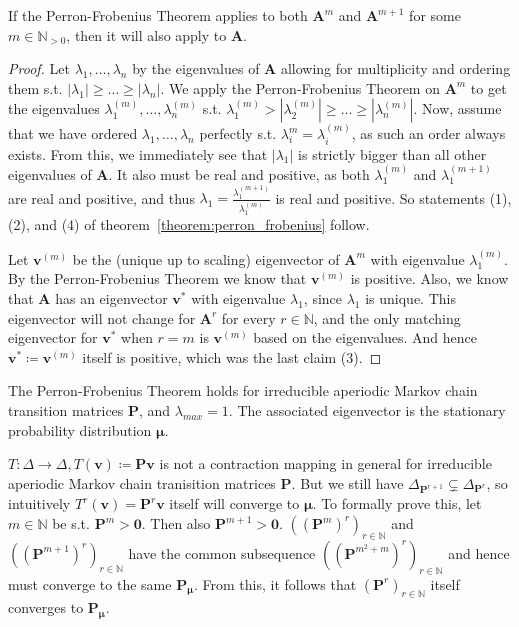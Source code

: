 \documentclass[../../main.tex]{subfiles}
\begin{document}
\begin{lemma}
    \label{lemma:perron_frobenius_extension_A_to_the_m}
    If the Perron-Frobenius Theorem applies to both $\bm{A}^m$ and $\bm{A}^{m+1}$ for some $m \in \mathbb{N}_{>0}$, then it will also apply to $\bm{A}$.
\end{lemma}
\vspace{-2.5em}
\begin{proof}
    Let $\lambda_1, \dots, \lambda_n$ by the eigenvalues of $\bm{A}$ allowing for multiplicity and ordering them s.t. $|\lambda_1| \geq \dots \geq |\lambda_n|$. We apply the Perron-Frobenius Theorem on $\bm{A}^{m}$ to get the eigenvalues $\lambda_1^{(m)}, \dots, \lambda_n^{(m)}$ s.t. $\lambda_1^{(m)} > |\lambda_2^{(m)}| \geq \dots \geq |\lambda_n^{(m)}|$. Now, assume that we have ordered $\lambda_1, \dots, \lambda_n$ perfectly s.t. $\lambda_i^{m} = \lambda_i^{(m)}$, as such an order always exists. From this, we immediately see that $|\lambda_1|$ is strictly bigger than all other eigenvalues of $\bm{A}$. It also must be real and positive, as both $\lambda_1^{(m)}$ and $\lambda_1^{(m + 1)}$ are real and positive, and thus $\lambda_1 = \frac{\lambda_1^{(m + 1)}}{\lambda_1^{(m)}}$ is real and positive. So statements (1), (2), and (4) of theorem~\ref{theorem:perron_frobenius} follow.

    Let $\bm{v}^{(m)}$ be the (unique up to scaling) eigenvector of $\bm{A}^{m}$ with eigenvalue $\lambda_1^{(m)}$. By the Perron-Frobenius Theorem we know that $\bm{v}^{(m)}$ is positive. Also, we know that $\bm{A}$ has an eigenvector $\bm{v}^*$ with eigenvalue $\lambda_1$, since $\lambda_1$ is unique. This eigenvector will not change for $\bm{A}^r$ for every $r \in \mathbb{N}$, and the only matching eigenvector for $\bm{v}^*$ when $r = m$ is $\bm{v}^{(m)}$ based on the eigenvalues. And hence $\bm{v}^* \coloneqq \bm{v}^{(m)}$ itself is positive, which was the last claim (3).
\end{proof}

\begin{corollary}
    The Perron-Frobenius Theorem holds for irreducible aperiodic Markov chain transition matrices $\bm{P}$, and $\lambda_{max} = 1$. The associated eigenvector is the stationary probability distribution $\bm{\mu}$.
\end{corollary}

\begin{remark}
    $T: \Delta \to \Delta, T(\bm{v}) \coloneqq \bm{Pv}$ is not a contraction mapping in general for irreducible aperiodic Markov chain tranisition matrices $\bm{P}$. But we still have $\Delta_{\bm{P}^{r+1}} \subsetneq \Delta_{\bm{P}^{r}}$, so intuitively $T^{r}(\bm{v}) = \bm{P}^r\bm{v}$ itself will converge to $\bm{\mu}$. To formally prove this, let $m \in \mathbb{N}$ be s.t. $\bm{P}^m > \bm{0}$. Then also $\bm{P}^{m + 1} > \bm{0}$. $((\bm{P}^m)^r)_{r \in \mathbb{N}}$ and $((\bm{P}^{m + 1})^r)_{r \in \mathbb{N}}$ have the common subsequence $((\bm{P}^{m^2 + m})^r)_{r \in \mathbb{N}}$ and hence must converge to the same $\bm{P_\mu}$. From this, it follows that $(\bm{P}^r)_{r \in \mathbb{N}}$ itself converges to $\bm{P_\mu}$.
\end{remark}
\end{document}
